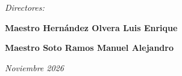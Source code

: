 \begin{minipage}[t][0.90\textheight][t]{0.79\textwidth}
\vspace{0.8cm}
{\fontsize{14}{17}\selectfont\itshape Directores:\par}
\vspace{0.18cm}
\begin{minipage}[t]{0.47\linewidth}
\centering
{\fontsize{16}{24}\selectfont\bfseries Maestro Hernández Olvera Luis Enrique\par}
\end{minipage}%
\hfill
\begin{minipage}[t]{0.47\linewidth}
\centering
{\fontsize{16}{24}\selectfont\bfseries Maestro Soto Ramos Manuel Alejandro\par}
\end{minipage}

\vfill
\begin{flushright}
{\fontsize{12}{14}\selectfont\itshape Noviembre 2026\par}
\end{flushright}
\end{minipage}

\clearpage

